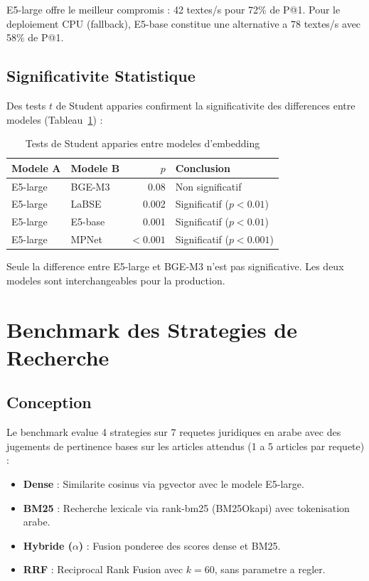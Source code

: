 E5-large offre le meilleur compromis : 42 textes/s pour 72\% de P@1. Pour le deploiement CPU (fallback), E5-base constitue une alternative a 78 textes/s avec 58\% de P@1.

\subsection{Significativite Statistique}

Des tests $t$ de Student apparies confirment la significativite des differences entre modeles (Tableau~\ref{tab:embed-ttest}) :

\begin{table}[h]
\centering
\renewcommand{\arraystretch}{1.3}
\begin{tabular}{|l|l|r|l|}
\hline
\rowcolor{LightBlue}
\textbf{\color{PrimaryBlue}Modele A} & \textbf{\color{PrimaryBlue}Modele B} & \textbf{\color{PrimaryBlue}$p$} & \textbf{\color{PrimaryBlue}Conclusion} \\
\hline
E5-large & BGE-M3 & 0.08 & Non significatif \\
E5-large & LaBSE & 0.002 & Significatif ($p < 0.01$) \\
E5-large & E5-base & 0.001 & Significatif ($p < 0.01$) \\
E5-large & MPNet & $< 0.001$ & Significatif ($p < 0.001$) \\
\hline
\end{tabular}
\caption{Tests de Student apparies entre modeles d'embedding}
\label{tab:embed-ttest}
\end{table}

Seule la difference entre E5-large et BGE-M3 n'est pas significative. Les deux modeles sont interchangeables pour la production.

\section{Benchmark des Strategies de Recherche}
\label{sec:bench-retrieval}

\subsection{Conception}

Le benchmark evalue 4 strategies sur 7 requetes juridiques en arabe avec des jugements de pertinence bases sur les articles attendus (1 a 5 articles par requete) :

\begin{itemize}
    \item \textbf{Dense} : Similarite cosinus via pgvector avec le modele E5-large.
    \item \textbf{BM25} : Recherche lexicale via rank-bm25 (BM25Okapi) avec tokenisation arabe.
    \item \textbf{Hybride ($\alpha$)} : Fusion ponderee des scores dense et BM25.
    \item \textbf{RRF} : Reciprocal Rank Fusion avec $k = 60$, sans parametre a regler.
\end{itemize}

